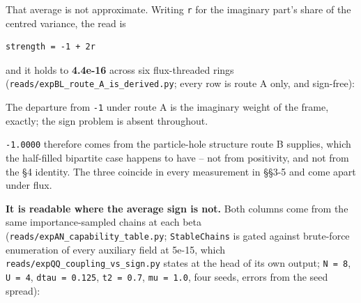 \documentclass[10pt,letterpaper,twocolumn]{article}
\begin{document}
That average is not approximate. Writing \texttt{r} for the imaginary part's share of the centred
variance, the read is

\begin{verbatim}
strength = -1 + 2r
\end{verbatim}

and it holds to \textbf{4.4e-16} across six flux-threaded rings
(\texttt{reads/\allowbreak{}expBL\_\allowbreak{}route\_\allowbreak{}A\_\allowbreak{}is\_\allowbreak{}derived.\allowbreak{}py}; every row is route A only, and sign-free):


The departure from \texttt{-{}\allowbreak{}1} under route A is the imaginary weight of the frame, exactly; the sign
problem is absent throughout.

\texttt{-{}\allowbreak{}1.\allowbreak{}0000} therefore comes from the particle-hole structure route B supplies, which the half-filled
bipartite case happens to have -- not from positivity, and not from the §4 identity. The three
coincide in every measurement in §§3-5 and come apart under flux.

\textbf{It is readable where the average sign is not.} Both columns come from the same
importance-sampled chains at each beta (\texttt{reads/\allowbreak{}expAN\_\allowbreak{}capability\_\allowbreak{}table.\allowbreak{}py}; \texttt{StableChains} is
gated against brute-force enumeration of every auxiliary field at 5e-15, which
\texttt{reads/\allowbreak{}expQQ\_\allowbreak{}coupling\_\allowbreak{}vs\_\allowbreak{}sign.\allowbreak{}py} states at the head of its own output; \texttt{N\ =\allowbreak{}\ 8}, \texttt{U\ =\allowbreak{}\ 4}, \texttt{dtau\ =\allowbreak{}\ 0.\allowbreak{}125}, \texttt{t2\ =\allowbreak{}\ 0.\allowbreak{}7}, \texttt{mu\ =\allowbreak{}\ 1.\allowbreak{}0},
four seeds, errors from the seed spread):
\end{document}
